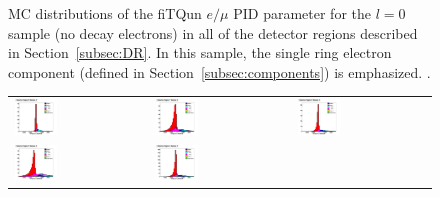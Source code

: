 \begin{figure}[h!]
\begin{tabular}{l  l  l}
\end{tabular}
\caption{MC distributions of the fiTQun $e/\mu$ PID parameter for the $l = 0$
sample (no decay electrons) in all of the detector regions described in
Section~\ref{subsec:DR}.  In this sample, the single ring electron component
(defined in Section~\ref{subsec:components}) is emphasized. 
\towall.}
\label{fig:samplot0}
\end{figure}

\begin{figure}[h!]
\centering
\begin{tabular}{l  l  l}
  \includegraphics[width=0.33\textwidth]{plots/mc_breakdown_comp_1_bin_0_att_0} 
  &\includegraphics[width=0.33\textwidth]{plots/mc_breakdown_comp_1_bin_1_att_0}  
  &\includegraphics[width=0.33\textwidth]{plots/mc_breakdown_comp_1_bin_2_att_0} \\
  \includegraphics[width=0.33\textwidth]{plots/mc_breakdown_comp_1_bin_3_att_0} 
  &\includegraphics[width=0.33\textwidth]{plots/mc_breakdown_comp_1_bin_4_att_0} 

\end{tabular}
\end{figure}
